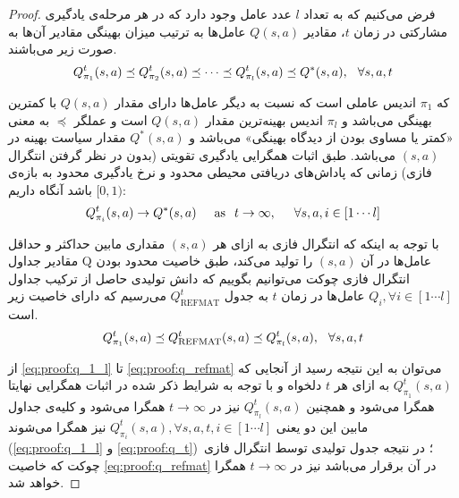 \begin{proof}\large
فرض می‌کنیم که به تعداد $l$ عدد عامل وجود دارد که در هر مرحله‌ی یادگیری مشارکتی در زمان $t$، مقادیر $Q(s, a)$ عامل‌ها به ترتیب میزان بهینگی مقادیر آن‌ها به صورت زیر می‌باشند.
\begin{equation}\label{eq:proof:q_1_l}
Q_{\pi_1}^t(s, a) \preceq Q_{\pi_2}^t(s, a) \preceq \cdots \preceq Q_{\pi_l}^t(s, a) \preceq Q^*(s, a),\hspace{.25cm} \forall s, a, t
\end{equation}

که $\pi_1$ اندیس عاملی است که نسبت به دیگر عامل‌ها دارای مقدار $Q(s, a)$ با کمترین بهینگی می‌باشد و $\pi_l$ اندیس بهینه‌ترین مقدار $Q(s, a)$ است و عملگر $\preceq$ به معنی «کمتر یا مساوی بودن از دیدگاه بهینگی» می‌باشد و $Q^*(s, a)$ مقدار سیاست بهینه‌ در $(s, a)$ می‌باشد. طبق اثبات همگرایی یادگیری تقویتی (بدون در نظر گرفتن انتگرال فازی) زمانی که پاداش‌های دریافتی محیطی محدود و نرخ یادگیری محدود به بازه‌ی $[0, 1)$ باشد آنگاه داریم:
\begin{equation}\label{eq:proof:q_t}
Q_{\pi_i}^t(s, a) \rightarrow Q^*(s, a)\hspace{.5cm}\text{as}\hspace{.25cm}t \rightarrow \infty,\hspace{.5cm}\forall s, a, i \in [1 \cdots l]
\end{equation}

با توجه به اینکه که انتگرال فازی به ازای هر $(s, a)$ مقداری مابین حداکثر و حداقل مقادیر جداول Q عامل‌ها در آن $(s, a)$ را تولید می‌کند، طبق خاصیت محدود بودن انتگرال فازی چوکت می‌توانیم بگوییم که دانش تولیدی حاصل از ترکیب جداول $Q_i, \forall i \in [1 \cdots l]$ عامل‌ها در زمان $t$ به جدول $Q_\text{REFMAT}^t$ می‌رسیم که دارای خاصیت زیر است.
\begin{equation}\label{eq:proof:q_refmat}
Q_{\pi_1}^t(s, a) \preceq Q_\text{REFMAT}^t(s, a) \preceq Q_{\pi_l}^t(s, a),\hspace{.25cm} \forall s, a, t  
\end{equation}

از
\ref{eq:proof:q_1_l} تا \ref{eq:proof:q_refmat} 
می‌توان به این نتیجه رسید از آنجایی که
$Q_{\pi_1}^t(s, a)$
به ازای هر $t$ دلخواه و با توجه به شرایط ذکر شده در اثبات همگرایی نهایتا همگرا می‌شود و همچنین
$Q_{\pi_l}^t(s, a)$
نیز در $t \rightarrow \infty$ همگرا می‌شود و کلیه‌ی جداول مابین این دو یعنی
$Q_{\pi_i}^t(s, a), \forall s, a, t, i \in [1 \cdots l]$
نیز همگرا می‌شوند
(\ref{eq:proof:q_1_l} و \ref{eq:proof:q_t})\
؛ در نتیجه جدول تولیدی توسط انتگرال فازی چوکت که خاصیت \ref{eq:proof:q_refmat} در آن برقرار می‌باشد نیز در $t \rightarrow \infty$ همگرا خواهد شد.
\end{proof}

